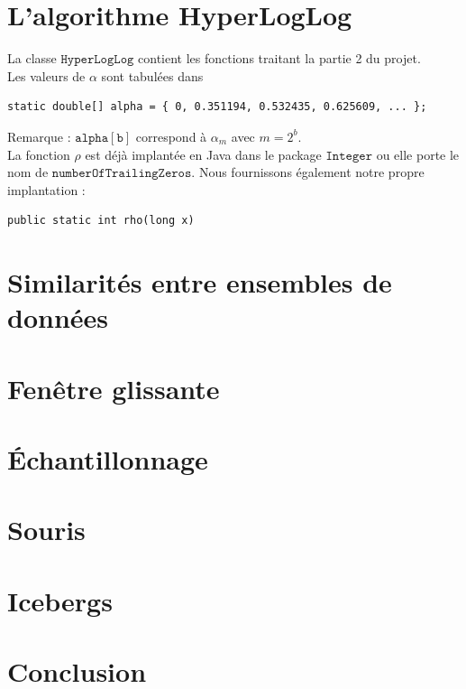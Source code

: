 \documentclass[12pt,a4paper,titlepage]{article}
\newcommand{\class}[1]{$\mathtt{#1}$}
\begin{document}
\newpage
\section{L'algorithme HyperLogLog}
La classe \class{HyperLogLog} contient les fonctions traitant la partie 2 du projet.\\
Les valeurs de $\alpha$ sont tabulées dans 
\begin{lstlisting}
static double[] alpha = { 0, 0.351194, 0.532435, 0.625609, ... };
\end{lstlisting}
Remarque : \class{alpha[b]} correspond à $\alpha_m$ avec $m=2^b$.\\

La fonction $\rho$ est déjà implantée en Java dans le package \class{Integer} ou elle porte le nom de \class{numberOfTrailingZeros}.
Nous fournissons également notre propre implantation :
\begin{lstlisting}
public static int rho(long x)
\end{lstlisting}



\newpage
\section{Similarités entre ensembles de données}





\newpage
\section{Fenêtre glissante}





\newpage
\section{Échantillonnage}





\newpage
\section{Souris}






\newpage
\section{Icebergs}





\newpage
\section*{Conclusion}
\end{document}

